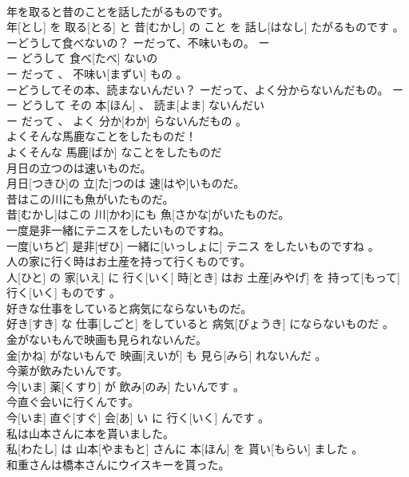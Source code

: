\documentclass[8pt]{extreport}
\begin{document}
\begin{CJK}{UTF8}{min}
\\	年を取ると昔のことを話したがるものです。	
\\	年[とし] を 取る[とる] と 昔[むかし] の こと を 話し[はなし] たがるものです 。
\\	ーどうして食べないの？ ーだって、不味いもの。	ー
\\	ー どうして 食べ[たべ] ないの 
\\	ー だって 、 不味い[まずい] もの 。
\\	ーどうしてその本、読まないんだい？ ーだって、よく分からないんだもの。	ー
\\	ー どうして その 本[ほん] 、 読ま[よま] ないんだい 
\\	ー だって 、 よく 分か[わか] らないんだもの 。
\\	よくそんな馬鹿なことをしたものだ！	
\\	よくそんな 馬鹿[ばか] なことをしたものだ 
\\	月日の立つのは速いものだ。	
\\	月日[つきひ]の 立[た]つのは 速[はや]いものだ。
\\	昔はこの川にも魚がいたものだ。	
\\	昔[むかし]はこの 川[かわ]にも 魚[さかな]がいたものだ。
\\	一度是非一緒にテニスをしたいものですね。	
\\	一度[いちど] 是非[ぜひ] 一緒に[いっしょに] テニス をしたいものですね 。
\\	人の家に行く時はお土産を持って行くものです。	
\\	人[ひと] の 家[いえ] に 行く[いく] 時[とき] はお 土産[みやげ] を 持って[もって] 行く[いく] ものです 。
\\	好きな仕事をしていると病気にならないものだ。	
\\	好き[すき] な 仕事[しごと] をしていると 病気[びょうき] にならないものだ 。
\\	金がないもんで映画も見られないんだ。	
\\	金[かね] がないもんで 映画[えいが] も 見ら[みら] れないんだ 。
\\	今薬が飲みたいんです。	
\\	今[いま] 薬[くすり] が 飲み[のみ] たいんです 。
\\	今直ぐ会いに行くんです。	
\\	今[いま] 直ぐ[すぐ] 会[あ] い に 行く[いく] んです 。
\\	私は山本さんに本を貰いました。	
\\	私[わたし] は 山本[やまもと] さんに 本[ほん] を 貰い[もらい] ました 。
\\	和重さんは橋本さんにウイスキーを貰った。	

\end{CJK}
\end{document}
